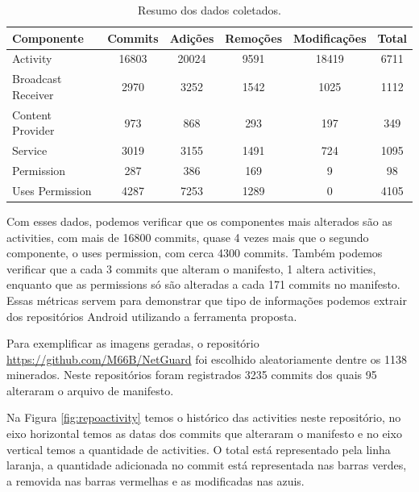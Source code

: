 \documentclass[a4paper,12pt]{article}
\begin{document}
{\begin{table}[h]
\begin{center}
\begin{tabular}{l|c|c|c|c|c}

 Componente & Commits & Adições & Remoções & Modificações & Total \\
\hline
Activity & 16803 & 20024 & 9591 & 18419 & 6711 \\
Broadcast Receiver & 2970 & 3252 & 1542 & 1025 & 1112 \\
Content Provider & 973 & 868 & 293 & 197 & 349 \\
Service & 3019 & 3155 & 1491 & 724 & 1095 \\
Permission & 287 & 386 & 169 & 9 & 98 \\
Uses Permission & 4287 & 7253 & 1289 & 0 & 4105 \\
\end{tabular}
\caption{Resumo dos dados coletados.}
\label{tab:statistcs}
\end{center}
\end{table}


Com esses dados, podemos verificar que os componentes mais alterados são as activities, com mais de 16800 commits, quase 4 vezes mais que o segundo componente, o uses permission, com cerca 4300 commits. Também podemos verificar que a cada 3 commits que alteram o manifesto, 1 altera activities, enquanto que as permissions só são alteradas a cada 171 commits no manifesto. Essas métricas servem para demonstrar que tipo de informações podemos extrair dos repositórios Android utilizando a ferramenta proposta. 

Para exemplificar as imagens geradas, o repositório {\fontsize{10pt}{12pt}\url{https://github.com/M66B/NetGuard}} foi escolhido aleatoriamente dentre os 1138 minerados. Neste repositórios foram registrados 3235 commits dos quais 95 alteraram o arquivo de manifesto.

Na Figura \ref{fig:repoactivity} temos o histórico das activities neste repositório, no eixo horizontal temos as datas dos commits que alteraram o manifesto e no eixo vertical temos a quantidade de activities. O total está representado pela linha laranja, a quantidade adicionada no commit está representada nas barras verdes, a removida nas barras vermelhas e as modificadas nas azuis. 


}
\end{document}
